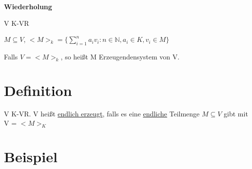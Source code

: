 \documentclass[a4paper, openany]{book}
\begin{document}
    \textbf{Wiederholung}

    \par \medskip

    V K-VR

    $M \subseteq V$, $<M>_k = \{\sum_{i=1}^{n} a_iv_i : n \in \mathbb{N}, a_i \in K, v_i \in M\}$

    Falls $V = <M>_k$, so heißt M Erzeugendensystem von V.

    \section{Definition}

    V K-VR. V heißt \underline{endlich erzeugt}, falls es eine \underline{endliche} Teilmenge $M \subseteq V$ gibt mit V = $<M>_K$

    \section{Beispiel}
\end{document}
